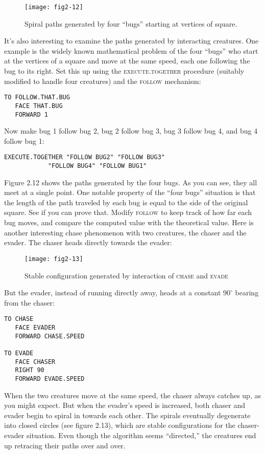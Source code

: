 \documentclass{book}
\begin{document}
\begin{figure}
\begin{center}
\texttt{[image: fig2-12]}
\caption{Spiral paths generated by four ``bugs'' starting at vertices of square.}
\end{center}
\end{figure}

It's also interesting to examine the paths generated by interacting
creatures. One example is the widely known mathematical problem
of the four ``bugs'' who start at the vertices of a square and move at
the same speed, each one following the bug to its right. Set this up
using the \textsc{execute.together} procedure (suitably modified to handle
four creatures) and the \textsc{follow} mechanism:

\begin{verbatim}
TO FOLLOW.THAT.BUG
   FACE THAT.BUG
   FORWARD 1
\end{verbatim}
Now make bug 1 follow bug 2, bug 2 follow bug 3, bug 3 follow bug 4,
and bug 4 follow bug 1:

\begin{verbatim}
EXECUTE.TOGETHER "FOLLOW BUG2" "FOLLOW BUG3" 
            "FOLLOW BUG4" "FOLLOW BUG1"
\end{verbatim}
Figure 2.12 shows the paths generated by the four bugs. As you can
see, they all meet at a single point. One notable property of the ``four
bugs'' situation is that the length of the path traveled by each bug is
equal to the side of the original square. See if you can prove that.
Modify \textsc{follow} to keep track of how far each bug moves, and compare
the computed value with the theoretical value.
Here is another interesting chase phenomenon with two creatures, the
chaser and the evader. The chaser heads directly towards the evader:

\begin{figure}
\begin{center}
\texttt{[image: fig2-13]}
\caption{Stable configuration generated by interaction of \textsc{chase} and \textsc{evade}}
\end{center}
\end{figure}

But the evader, instead of running directly away, heads at a constant $90^{\circ}$ bearing from the chaser:


\begin{verbatim}
TO CHASE
   FACE EVADER
   FORWARD CHASE.SPEED

TO EVADE
   FACE CHASER
   RIGHT 90
   FORWARD EVADE.SPEED
\end{verbatim}
When the two creatures move at the same speed, the chaser always
catches up, as you might expect. But when the evader's speed is increased, both chaser and evader begin to spiral in towards each other.
The spirals eventually degenerate into closed circles (see figure 2.13),
which are stable configurations for the chaser-evader situation. Even
though the algorithm seems ``directed,'' the creatures end up retracing
their paths over and over.
\end{document}
